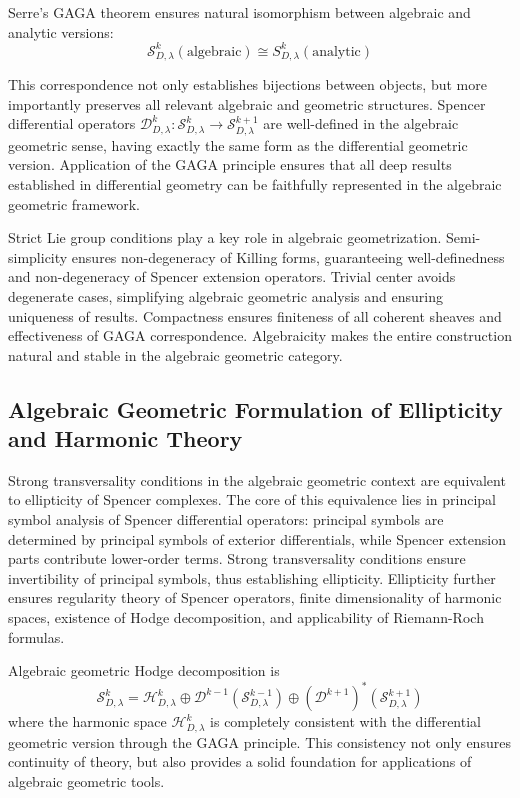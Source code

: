 \documentclass[a4paper,12pt]{extarticle}
\theoremstyle{definition}
\begin{document}
Serre's GAGA theorem\cite{serre1956geometrie} ensures natural isomorphism between algebraic and analytic versions:
\begin{equation}\label{eq:gaga-correspondence}
\mathcal{S}^k_{D,\lambda}(\text{algebraic}) \cong S^k_{D,\lambda}(\text{analytic})
\end{equation}

This correspondence not only establishes bijections between objects, but more importantly preserves all relevant algebraic and geometric structures. Spencer differential operators $\mathcal{D}^k_{D,\lambda}: \mathcal{S}^k_{D,\lambda} \to \mathcal{S}^{k+1}_{D,\lambda}$ are well-defined in the algebraic geometric sense, having exactly the same form as the differential geometric version. Application of the GAGA principle ensures that all deep results established in differential geometry can be faithfully represented in the algebraic geometric framework.

Strict Lie group conditions play a key role in algebraic geometrization. Semi-simplicity ensures non-degeneracy of Killing forms, guaranteeing well-definedness and non-degeneracy of Spencer extension operators. Trivial center avoids degenerate cases, simplifying algebraic geometric analysis and ensuring uniqueness of results. Compactness ensures finiteness of all coherent sheaves and effectiveness of GAGA correspondence. Algebraicity makes the entire construction natural and stable in the algebraic geometric category.

\subsection{Algebraic Geometric Formulation of Ellipticity and Harmonic Theory}

Strong transversality conditions in the algebraic geometric context are equivalent to ellipticity of Spencer complexes. The core of this equivalence lies in principal symbol analysis of Spencer differential operators: principal symbols are determined by principal symbols of exterior differentials, while Spencer extension parts contribute lower-order terms. Strong transversality conditions ensure invertibility of principal symbols, thus establishing ellipticity. Ellipticity further ensures regularity theory of Spencer operators, finite dimensionality of harmonic spaces, existence of Hodge decomposition, and applicability of Riemann-Roch formulas.

Algebraic geometric Hodge decomposition is
\begin{equation}\label{eq:alg-hodge-decomp}
\mathcal{S}^k_{D,\lambda} = \mathcal{H}^k_{D,\lambda} \oplus \mathcal{D}^{k-1}(\mathcal{S}^{k-1}_{D,\lambda}) \oplus (\mathcal{D}^{k+1})^*(\mathcal{S}^{k+1}_{D,\lambda})
\end{equation}
where the harmonic space $\mathcal{H}^k_{D,\lambda}$ is completely consistent with the differential geometric version through the GAGA principle. This consistency not only ensures continuity of theory, but also provides a solid foundation for applications of algebraic geometric tools.
\end{document}
